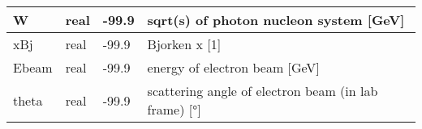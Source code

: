 \documentclass{article}
\begin{document}
\begin{longtable}{llll}
\midrule
W & \begin{minipage}[t]{2cm}real\end{minipage} & \begin{minipage}[t]{2cm}-99.9\end{minipage} & \begin{minipage}[t]{12cm}sqrt(s) of photon nucleon system [GeV]\end{minipage}\\*
\midrule
xBj & \begin{minipage}[t]{2cm}real\end{minipage} & \begin{minipage}[t]{2cm}-99.9\end{minipage} & \begin{minipage}[t]{12cm}Bjorken x [1]\end{minipage}\\*
\midrule
Ebeam & \begin{minipage}[t]{2cm}real\end{minipage} & \begin{minipage}[t]{2cm}-99.9\end{minipage} & \begin{minipage}[t]{12cm}energy of electron beam [GeV]\end{minipage}\\*
\midrule
theta & \begin{minipage}[t]{2cm}real\end{minipage} & \begin{minipage}[t]{2cm}-99.9\end{minipage} & \begin{minipage}[t]{12cm}scattering angle of electron beam (in lab frame) [°]\end{minipage}\\*
\bottomrule
\end{longtable}
{ }



\end{document}

